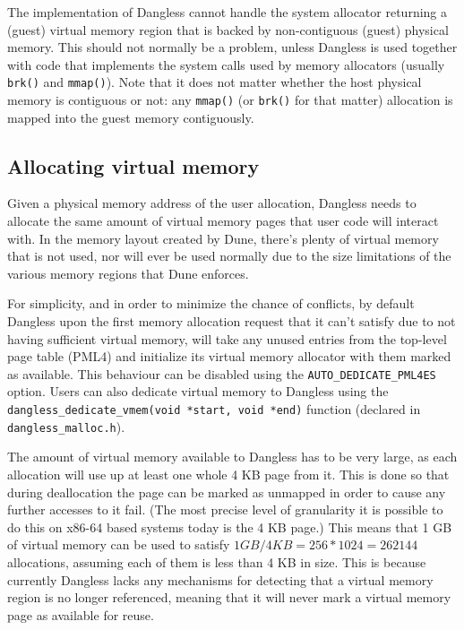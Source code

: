 The implementation of Dangless cannot handle the system allocator returning a (guest) virtual memory region that is backed by non-contiguous (guest) physical memory. This should not normally be a problem, unless Dangless is used together with code that implements the system calls used by memory allocators (usually \lstinline!brk()! and \lstinline!mmap()!).
Note that it does not matter whether the host physical memory is contiguous or not: any \lstinline!mmap()! (or \lstinline!brk()! for that matter) allocation is mapped into the guest memory contiguously. 

\subsection{Allocating virtual memory}
\label{sec:dangless-alloc-virtmem}

Given a physical memory address of the user allocation, Dangless needs to allocate the same amount of virtual memory pages that user code will interact with. In the memory layout created by Dune, there's plenty of virtual memory that is not used, nor will ever be used normally due to the size limitations of the various memory regions that Dune enforces.

For simplicity, and in order to minimize the chance of conflicts, by default Dangless upon the first memory allocation request that it can't satisfy due to not having sufficient virtual memory, will take any unused entries from the top-level page table (PML4)  and initialize its virtual memory allocator with them marked as available. This behaviour can be disabled using the \lstinline!AUTO_DEDICATE_PML4ES! option. Users can also dedicate virtual memory to Dangless using the \lstinline!dangless_dedicate_vmem(void *start, void *end)! function (declared in \texttt{dangless\_malloc.h}).

The amount of virtual memory available to Dangless has to be very large, as each allocation will use up at least one whole 4 KB page from it. This is done so that during deallocation the page can be marked as unmapped in order to cause any further accesses to it fail. (The most precise level of granularity it is possible to do this on x86-64 based systems today is the 4 KB page.) This means that 1 GB of virtual memory can be used to satisfy $1 GB / 4 KB = 256 * 1024 = 262 144$ allocations, assuming each of them is less than 4 KB in size. This is because currently Dangless lacks any mechanisms for detecting that a virtual memory region is no longer referenced, meaning that it will never mark a virtual memory page as available for reuse.

